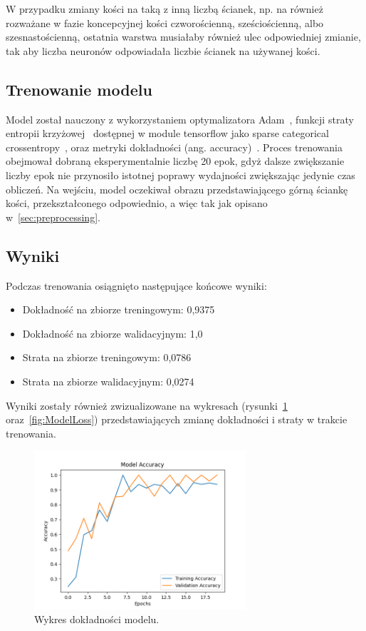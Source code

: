 W przypadku zmiany kości na taką z inną liczbą ścianek, np.
na również rozważane w fazie koncepcyjnej kości czworościenną, sześciościenną, albo szesnastościenną,
ostatnia warstwa musiałaby również ulec odpowiedniej zmianie,
tak aby liczba neuronów odpowiadała liczbie ścianek na używanej kości.

\subsection{Trenowanie modelu}\label{subsec:trenowanie-modelu}

Model został nauczony z wykorzystaniem optymalizatora Adam~\cite{kingma2014adam, keras_adam},
funkcji straty entropii krzyżowej~\cite{crossentropy} dostępnej w module tensorflow jako sparse categorical crossentropy~\cite{tensorflow_loss},
oraz metryki dokładności (ang. accuracy)~\cite{tensorflow_accuracy}.
Proces trenowania obejmował dobraną eksperymentalnie liczbę 20 epok, gdyż dalsze zwiększanie liczby epok nie przynosiło istotnej poprawy wydajności zwiększając jedynie czas obliczeń.
Na wejściu, model oczekiwał obrazu przedstawiającego górną ściankę kości, przekształconego odpowiednio, a więc tak jak opisano w~\ref{sec:preprocessing}.


\subsection{Wyniki}\label{subsec:wyniki}

Podczas trenowania osiągnięto następujące końcowe wyniki:

\begin{itemize}
    \item Dokładność na zbiorze treningowym: 0,9375
    \item Dokładność na zbiorze walidacyjnym: 1,0
    \item Strata na zbiorze treningowym: 0,0786
    \item Strata na zbiorze walidacyjnym: 0,0274
\end{itemize}

Wyniki zostały również zwizualizowane na wykresach (rysunki~\ref{fig:ModelAcc} oraz~\ref{fig:ModelLoss})
przedstawiających zmianę dokładności i straty w trakcie trenowania.

\begin{figure}[H]
    \centering
    \includegraphics[width=0.7\textwidth]{chapters/04-czytanie/figures/ModelAcc1}
    \caption{Wykres dokładności modelu.}
    \label{fig:ModelAcc}
\end{figure}

